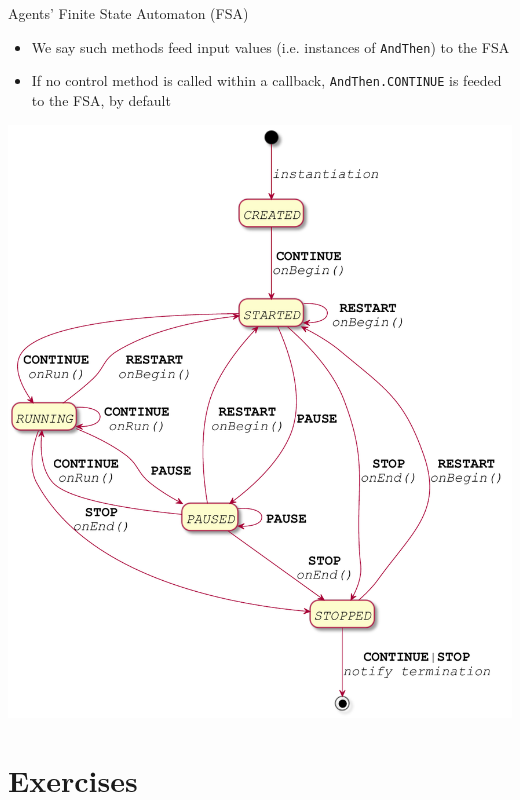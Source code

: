 \documentclass[presentation]{beamer}\mode<presentation>{\usetheme{AMSCesenaPurpleAndGold}}
\begin{document}
\begin{frame}[allowframebreaks]{Agents' Finite State Automaton (FSA)}
\begin{itemize}
        \vspace{.3cm}
        
        \item We say such methods \alert{feed} input values (i.e. instances of \texttt{AndThen}) to the FSA
        
        \vspace{.3cm}
        
        \item If no \alert{control method} is called within a callback, \texttt{AndThen.\alert{CONTINUE}} is feeded to the FSA, by default
    \end{itemize}
    
    \framebreak
    
    \begin{center}
        \includegraphics[height=.9\textheight]{img/fsa.pdf}
    \end{center}
    
\end{frame}

\section{Exercises}
\end{document}
